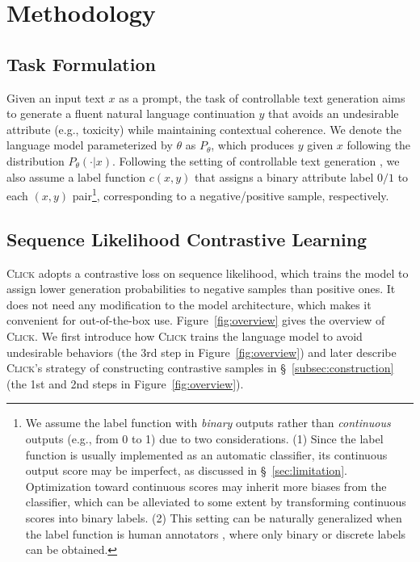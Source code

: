 \section{Methodology}
\label{sec:method}

\subsection{Task Formulation}
\label{subsec:formulation}

Given an input text $x$ as a prompt, the task of controllable text generation aims to generate a fluent natural language continuation $y$ that avoids an undesirable attribute (e.g., toxicity) while maintaining contextual coherence. We denote the language model parameterized by $\theta$ as $P_{\theta}$, which produces $y$ given $x$ following the distribution $P_{\theta} (\cdot | x)$. Following the setting of controllable text generation \cite{dexperts, quark}, we also assume a label function $c(x, y)$ that assigns a binary attribute label $0/1$ to each $(x, y)$ pair\footnote{
  We assume the label function with \textit{binary} outputs rather than \textit{continuous} outputs (e.g., from 0 to 1) due to two considerations. (1) Since the label function is usually implemented as an automatic classifier, its continuous output score may be imperfect, as discussed in \S~\ref{sec:limitation}. 
  Optimization toward continuous scores may inherit more biases from the classifier, which can be alleviated to some extent by transforming continuous scores into binary labels. (2) This setting can be naturally generalized when the label function is human annotators \cite{instructgpt}, where only binary or discrete labels can be obtained. }, corresponding to a negative/positive sample, respectively.

\subsection{Sequence Likelihood Contrastive Learning}
\label{subsec:contrastive}

\textsc{Click} adopts a contrastive loss on sequence likelihood, which trains the model to assign lower generation probabilities to negative samples than positive ones. It does not need any modification to the model architecture, which makes it convenient for out-of-the-box use.
Figure~\ref{fig:overview} gives the overview of \textsc{Click}.
We first introduce how \textsc{Click} trains the language model to avoid undesirable behaviors (the 3rd step in Figure~\ref{fig:overview}) and later describe \textsc{Click}'s strategy of constructing contrastive samples in \S~\ref{subsec:construction} (the 1st and 2nd steps in Figure~\ref{fig:overview}).


